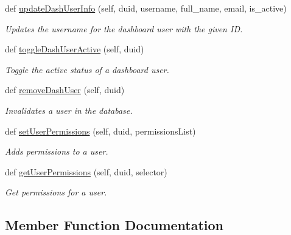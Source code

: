\begin{DoxyCompactItemize}
def \hyperlink{classuser_1_1_user_handler_ae7d63d12f70cd399b3fd9a5d5fd28d82}{update\+Dash\+User\+Info} (self, duid, username, full\+\_\+name, email, is\+\_\+active)
\begin{DoxyCompactList}\small\item\em Updates the username for the dashboard user with the given ID. \end{DoxyCompactList}\item 
def \hyperlink{classuser_1_1_user_handler_abbd281b19b1cb06e98de34ef756d9a17}{toggle\+Dash\+User\+Active} (self, duid)
\begin{DoxyCompactList}\small\item\em Toggle the active status of a dashboard user. \end{DoxyCompactList}\item 
def \hyperlink{classuser_1_1_user_handler_a9d7c736b2c572f595a2c32fb78d77590}{remove\+Dash\+User} (self, duid)
\begin{DoxyCompactList}\small\item\em Invalidates a user in the database. \end{DoxyCompactList}\item 
def \hyperlink{classuser_1_1_user_handler_a8560cf2f90768ffc9f1986518f50e675}{set\+User\+Permissions} (self, duid, permissions\+List)
\begin{DoxyCompactList}\small\item\em Adds permissions to a user. \end{DoxyCompactList}\item 
def \hyperlink{classuser_1_1_user_handler_a7a6ab368d3ebce72188e6ef10c438f96}{get\+User\+Permissions} (self, duid, selector)
\begin{DoxyCompactList}\small\item\em Get permissions for a user. \end{DoxyCompactList}\end{DoxyCompactItemize}


\subsection{Member Function Documentation}
\mbox{\label{classuser_1_1_user_handler_a1bb6eb54e9d789a656651ab012c25a8c}} 
